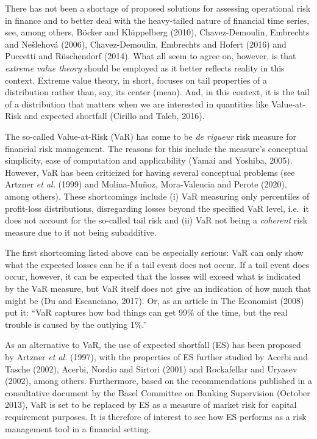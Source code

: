 \documentclass[a4paper,11pt]{article}
\theoremstyle{definition}
\theoremstyle{definition}
\theoremstyle{definition}
\theoremstyle{definition}
\theoremstyle{remark}
\begin{document}
There has not been a shortage of proposed solutions for assessing operational risk in finance and to better deal with the heavy-tailed nature of financial time series, see, among others, Böcker and Klüppelberg (2010), Chavez-Demoulin, Embrechts and Nešlehová (2006), Chavez-Demoulin, Embrechts and Hofert (2016) and Puccetti and Rüschendorf (2014). What all seem to agree on, however, is that \emph{extreme value theory} should be employed as it better reflects reality in this context. Extreme value theory, in short, focuses on tail properties of a distribution rather than, say, its center (mean). And, in this context, it is the tail of a distribution that matters when we are interested in quantities like Value-at-Risk and expected shortfall (Cirillo and Taleb, 2016).

The so-called Value-at-Risk (VaR) has come to be \emph{de rigueur} risk measure for financial risk management. The reasons for this include the measure's conceptual simplicity, ease of computation and applicability (Yamai and Yoshiba, 2005). However, VaR has been criticized for having several conceptual problems (see Artzner \emph{et al.} (1999) and Molina-Muñoz, Mora-Valencia and Perote (2020), among others). These shortcomings include (i) VaR measuring only percentiles of profit-loss distributions, disregarding losses beyond the specified VaR level, i.e.~it does not account for the so-called tail risk and (ii) VaR not being a \emph{coherent} risk measure due to it not being subadditive.

The first shortcoming listed above can be especially serious: VaR can only show what the expected losses can be if a tail event does not occur. If a tail event does occur, however, it can be expected that the losses will exceed what is indicated by the VaR measure, but VaR itself does not give an indication of how much that might be (Du and Escanciano, 2017). Or, as an article in The Economist (2008) put it: ``VaR captures how bad things can get 99\% of the time, but the real trouble is caused by the outlying 1\%.''

As an alternative to VaR, the use of expected shortfall (ES) has been proposed by Artzner \emph{et al.} (1997), with the properties of ES further studied by Acerbi and Tasche (2002), Acerbi, Nordio and Sirtori (2001) and Rockafellar and Uryasev (2002), among others. Furthermore, based on the recommendations published in a consultative document by the Basel Committee on Banking Supervision (October 2013), VaR is set to be replaced by ES as a measure of market risk for capital requirement purposes. It is therefore of interest to see how ES performs as a risk management tool in a financial setting.
\end{document}
